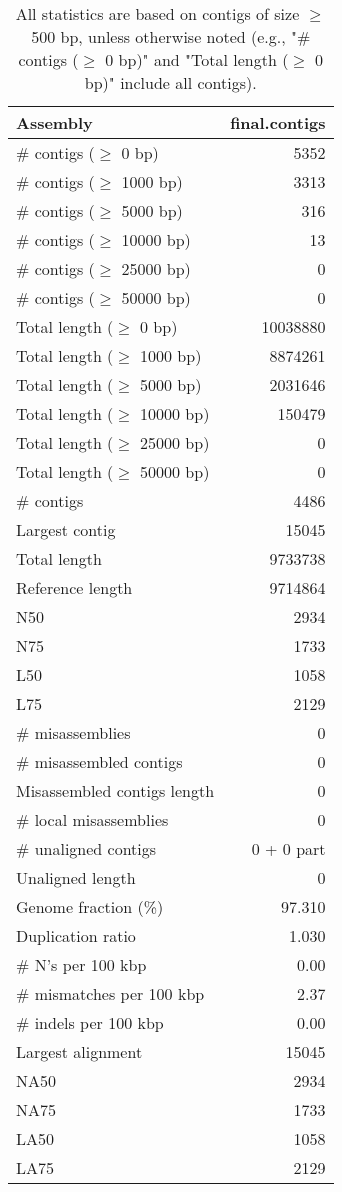 \documentclass[12pt,a4paper]{article}
\begin{document}
\begin{table}[ht]
\begin{center}
\caption{All statistics are based on contigs of size $\geq$ 500 bp, unless otherwise noted (e.g., "\# contigs ($\geq$ 0 bp)" and "Total length ($\geq$ 0 bp)" include all contigs).}
\begin{tabular}{|l*{1}{|r}|}
\hline
Assembly & final.contigs \\ \hline
\# contigs ($\geq$ 0 bp) & 5352 \\ \hline
\# contigs ($\geq$ 1000 bp) & 3313 \\ \hline
\# contigs ($\geq$ 5000 bp) & 316 \\ \hline
\# contigs ($\geq$ 10000 bp) & 13 \\ \hline
\# contigs ($\geq$ 25000 bp) & 0 \\ \hline
\# contigs ($\geq$ 50000 bp) & 0 \\ \hline
Total length ($\geq$ 0 bp) & 10038880 \\ \hline
Total length ($\geq$ 1000 bp) & 8874261 \\ \hline
Total length ($\geq$ 5000 bp) & 2031646 \\ \hline
Total length ($\geq$ 10000 bp) & 150479 \\ \hline
Total length ($\geq$ 25000 bp) & 0 \\ \hline
Total length ($\geq$ 50000 bp) & 0 \\ \hline
\# contigs & 4486 \\ \hline
Largest contig & 15045 \\ \hline
Total length & 9733738 \\ \hline
Reference length & 9714864 \\ \hline
N50 & 2934 \\ \hline
N75 & 1733 \\ \hline
L50 & 1058 \\ \hline
L75 & 2129 \\ \hline
\# misassemblies & 0 \\ \hline
\# misassembled contigs & 0 \\ \hline
Misassembled contigs length & 0 \\ \hline
\# local misassemblies & 0 \\ \hline
\# unaligned contigs & 0 + 0 part \\ \hline
Unaligned length & 0 \\ \hline
Genome fraction (\%) & 97.310 \\ \hline
Duplication ratio & 1.030 \\ \hline
\# N's per 100 kbp & 0.00 \\ \hline
\# mismatches per 100 kbp & 2.37 \\ \hline
\# indels per 100 kbp & 0.00 \\ \hline
Largest alignment & 15045 \\ \hline
NA50 & 2934 \\ \hline
NA75 & 1733 \\ \hline
LA50 & 1058 \\ \hline
LA75 & 2129 \\ \hline
\end{tabular}
\end{center}
\end{table}
\end{document}
